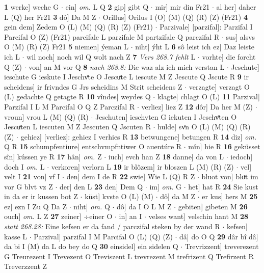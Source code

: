 \documentclass[8pt,a4paper,notitlepage]{article}
\begin{document}
\begin{table}[ht]
\begin{minipage}[t]{0.5\linewidth}
\textbf{1} werke] weche G  $\cdot$ ein] \textit{om.} L Q \textbf{2} gip] gibt Q  $\cdot$ mir] mir din Fr21  $\cdot$ al her] daher L (Q) her Fr21 \textbf{3} dô] Da M Z  $\cdot$ Orillus] Orilus I (O) (M) (Q) (R) (Z) (Fr21) \textbf{4} gein dem] Zedem O (L) (M) (Q) (R) (Z) (Fr21)  $\cdot$ Parzivale] [parzifal]: Parzifal I Parcifal O (Z) (Fr21) parcifale L parzifale M partzifale Q parczifal R  $\cdot$ sus] alsvs O (M) (R) (Z) Fr21 \textbf{5} niemen] ýeman L  $\cdot$ niht] ýht L \textbf{6} sô leist ich ez] Daz leiste ich L  $\cdot$ wil noch] noch wil Q wolt nach Z \textbf{7} \textit{Vers 268.7 fehlt} L   $\cdot$ vorhte] die forcht Q (Z)  $\cdot$ von] an M vor Q \textbf{8} \textit{nach 268.8:} Die waz alz ich mich verstan L   $\cdot$ Jeschute] ieschute G ieskute I Jeschvͦte O Jescuͯte L iescute M Z Jescute Q Jscute R \textbf{9} ir scheidens] ir frivndes G Jrs scheidins M Strit scheidens Z  $\cdot$ verzagte] verzagt O (L) gedachte Q getagte R \textbf{10} vîndes] weydes Q  $\cdot$ klagte] chlagt O (L) \textbf{11} Parzival] Parzifal I L M Parcifal O Q Z Parczifal R  $\cdot$ verliez] liez Z \textbf{12} dôr] Da her M (Z)  $\cdot$ vroun] vrou L (M) (Q) (R)  $\cdot$ Jeschuten] ieschvten G iekuten I Jeschvͦten O Jescuͯten L iescuten M Z Jescuten Q Jscuten R  $\cdot$ hulde] svͦn O (L) (M) (Q) (R) (Z)  $\cdot$ gehiez] [verliez]: gehiez I verhies R \textbf{13} betwungene] betungen R \textbf{14} diz] \textit{om.} Q R \textbf{15} schumpfentiure] entschvmpfntiwer O auentúre R  $\cdot$ mîn] hie R \textbf{16} geküsset sîn] kússen ye R \textbf{17} hân] \textit{om.} Z  $\cdot$ iuch] evch han Z \textbf{18} danne] da von L  $\cdot$ iedoch] doch I \textit{om.} L  $\cdot$ verkoren] verlorn L \textbf{19} ir blôzem] ir bloszen L (M) (R) (Z)  $\cdot$ vel] velt I \textbf{21} von] vf I  $\cdot$ den] dem I de R \textbf{22} swie] Wie L (Q) R Z  $\cdot$ bluot von] bloͮt im vor G blvt vz Z  $\cdot$ der] den L \textbf{23} den] Dem Q  $\cdot$ im] \textit{om.} G  $\cdot$ het] hat R \textbf{24} Sie kust in da er ir kussen bot Z  $\cdot$ küst] kvste O (L) (M)  $\cdot$ dô] da M Z  $\cdot$ er kus] hers M \textbf{25} ez] ezn I Zu Q Da Z  $\cdot$ niht] \textit{om.} Q  $\cdot$ dô] da I O L M Z  $\cdot$ gebiten] gibeten M \textbf{26} ouch] \textit{om.} L Z \textbf{27} zeiner] ÷einer O  $\cdot$ in] an I  $\cdot$ velses want] velschin hant M \textbf{28} \textit{statt 268.28:} Eine kefsen er da fand / parczifal steken by der wand R   $\cdot$ kefsen] kasse L  $\cdot$ Parzival] parzifal I M Parcifal O (L) (Q) (Z)  $\cdot$ dâ] do O Q \textbf{29} dâr bî dâ] da bi I (M) da L do bey do Q \textbf{30} einsidel] ein sidelen Q  $\cdot$ Trevrizzent] treverezent G Treurezent I Trevezent O Treviszent L trevrezent M trefrizent Q Trefirzent R Treverzzent Z \newline

\end{minipage}
\end{table}
\end{document}
